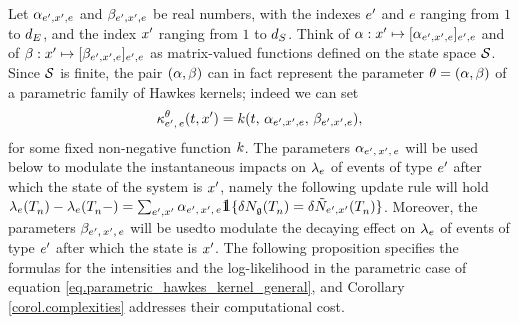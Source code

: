 \documentclass[10pt]{article}
\begin{document}
Let $\impCoef_{\eone,\xone, e}$ and $\decCoef_{\eone,\xone, e}$ be real numbers, with the indexes $\eone$ and $e$ ranging from $1$ to $\numEventTypes$, and the index $\xone$ ranging from $1$ to $\numStates$. Think of $\impCoef: \xone \mapsto [\impCoef_{\eone,\xone,e}]_{\eone,e}$ and of $\decCoef: \xone \mapsto [\decCoef_{\eone,\xone,e}]_{\eone,e}$ as matrix-valued functions defined on the state space $\stateSpace$. Since $\stateSpace$ is finite, the pair $(\impCoef,\decCoef)$ can in fact represent the parameter $\theta = (\impCoef,\decCoef)$ of a parametric family of Hawkes kernels; indeed we can set
\begin{equation}\label{eq.parametric_hawkes_kernel_general}
 \hawkesKernel^{\theta}\subscriptee(t,\xone)
 = \parametricHawkesKernel(t,\, \impCoef_{\eone,\xone,e},\, \decCoef_{\eone,\xone,e}),
\end{equation}
for some fixed non-negative function $\parametricHawkesKernel$. The parameters $\impCoef\subscriptexe$ will be used below to modulate the instantaneous impacts on $\intensity[e]$ of events of type $\eone$ after which the state of the system is $\xone$, namely the following update rule will hold $\intensity[e](\arrivalTimes[]_n) - \intensity[e](\arrivalTimes[]_n - ) = \sum_{\eone, \xone} \impCoef\subscriptexe \one \lbrace \delta\groundProc(\arrivalTimes[]_n) = \delta\hybridHawkes_{\eone,\xone}(\arrivalTimes[]_n)\rbrace$. Moreover, the parameters $\decCoef\subscriptexe$ will be usedto modulate the decaying effect on $\intensity[e]$ of events of type $\eone$ after which the state is $\xone$.
The  following proposition specifies the formulas for the intensities and the log-likelihood in the parametric case of equation \eqref{eq.parametric_hawkes_kernel_general}, and Corollary \ref{corol.complexities} addresses their computational cost. 
\end{document}
